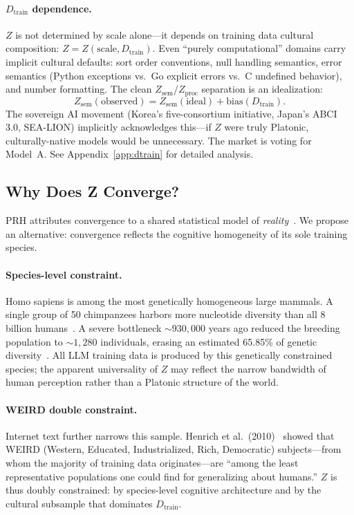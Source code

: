 \documentclass[11pt]{article}
\theoremstyle{definition}
\newcommand{\Zsem}{Z_{\text{sem}}}
\newcommand{\Zproc}{Z_{\text{proc}}}
\newcommand{\Dtrain}{D_{\text{train}}}
\begin{document}
\paragraph{$\Dtrain$ dependence.}
$Z$ is not determined by scale alone---it depends on training data cultural composition: $Z = Z(\text{scale}, \Dtrain)$. Even ``purely computational'' domains carry implicit cultural defaults: sort order conventions, null handling semantics, error semantics (Python exceptions vs.\ Go explicit errors vs.\ C undefined behavior), and number formatting. The clean $\Zsem$/$\Zproc$ separation is an idealization:
\[
\Zsem(\text{observed}) = \Zsem(\text{ideal}) + \mathrm{bias}(\Dtrain).
\]
The sovereign AI movement (Korea's five-consortium initiative, Japan's ABCI 3.0, SEA-LION) implicitly acknowledges this---if $Z$ were truly Platonic, culturally-native models would be unnecessary. The market is voting for Model~A. See Appendix~\ref{app:dtrain} for detailed analysis.

\subsection{Why Does Z Converge?}\label{sec:whydoes}

PRH attributes convergence to a shared statistical model of \emph{reality}~\cite{huh2024platonic}. We propose an alternative: convergence reflects the cognitive homogeneity of its sole training species.

\paragraph{Species-level constraint.}
Homo sapiens is among the most genetically homogeneous large mammals. A single group of 50 chimpanzees harbors more nucleotide diversity than all 8 billion humans~\cite{pradomartinez2013apes}. A severe bottleneck ${\sim}930{,}000$ years ago reduced the breeding population to ${\sim}1{,}280$ individuals, erasing an estimated 65.85\% of genetic diversity~\cite{hu2023bottleneck}. All LLM training data is produced by this genetically constrained species; the apparent universality of $Z$ may reflect the narrow bandwidth of human perception rather than a Platonic structure of the world.

\paragraph{WEIRD double constraint.}
Internet text further narrows this sample. Henrich et al.\ (2010)~\cite{henrich2010weird} showed that WEIRD (Western, Educated, Industrialized, Rich, Democratic) subjects---from whom the majority of training data originates---are ``among the least representative populations one could find for generalizing about humans.'' $Z$ is thus doubly constrained: by species-level cognitive architecture and by the cultural subsample that dominates $\Dtrain$.
\end{document}

